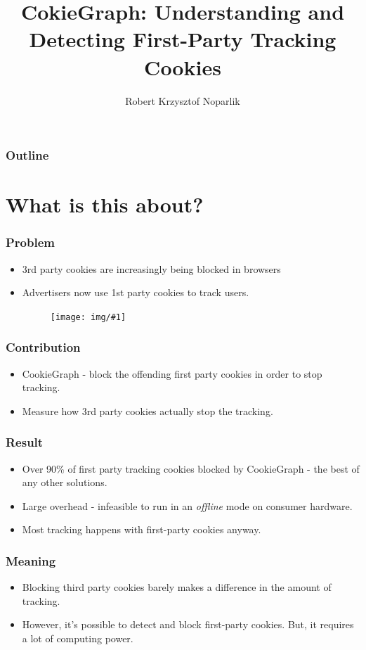 \documentclass{beamer}
\title{CokieGraph:
Understanding and Detecting First-Party Tracking Cookies}
\author{Robert Krzysztof Noparlik}
\newcommand{\pic}[1]{
\begin{figure}
\vspace{1cm}
\texttt{[image: img/\#1]}
\end{figure}
}
\begin{document}
\begin{frame}
\titlepage
\end{frame}

\begin{frame}
\frametitle{Outline}
\tableofcontents
\end{frame}


\section{What is this about?}


\begin{frame}
\frametitle{Problem}
\begin{itemize}
\item 3rd party cookies are increasingly being blocked in browsers
\item Advertisers now use 1st party cookies to track users. 

\pic{cookie}

\end{itemize}
\end{frame}


\begin{frame}
\frametitle{Contribution}

\begin{itemize}
\item CookieGraph - block the offending first party cookies in order to stop tracking.
\item Measure how 3rd party cookies actually stop the tracking.
\end{itemize}
\end{frame}

\begin{frame}
\frametitle{Result}

\begin{itemize}
\item Over 90\% of first party tracking cookies blocked by CookieGraph - the best of any other solutions.
\item Large overhead - infeasible to run in an \textit{offline} mode on consumer hardware.
\item Most tracking happens with first-party cookies anyway.
\end{itemize}
\end{frame}

\begin{frame}
\frametitle{Meaning}
\begin{itemize}
\item Blocking third party cookies barely makes a difference in the amount of tracking.
\item However, it's possible to detect and block first-party cookies. But, it requires a lot of computing power.
\end{itemize}
\end{frame}
\end{document}
